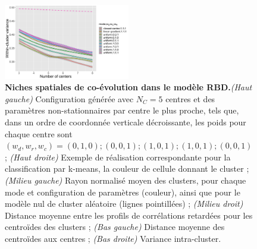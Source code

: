 \documentclass[11pt]{article}
\begin{document}
\begin{figure}
	\includegraphics[width=0.49\textwidth]{figures/withinss.png}
	\caption{\textbf{Niches spatiales de co-évolution dans le modèle RBD.}\textit{(Haut gauche)} Configuration générée avec $N_C = 5$ centres et des paramètres non-stationnaires par centre le plus proche, tels que, dans un ordre de coordonnée verticale décroissante, les poids pour chaque centre sont $(w_d,w_r,w_c) = (0,1,0) ; (0,0,1) ; (1,0,1) ; (1,0,1) ; (0,0,1)$ ; \textit{(Haut droite)} Exemple de réalisation correspondante pour la classification par k-means, la couleur de cellule donnant le cluster ; \textit{(Milieu gauche)} Rayon normalisé moyen des clusters, pour chaque mode et configuration de paramètres (couleur), ainsi que pour le modèle nul de cluster aléatoire (lignes pointillées) ; \textit{(Milieu droit)} Distance moyenne entre les profils de corrélations retardées pour les centroïdes des clusters ; \textit{(Bas gauche)} Distance moyenne des centroïdes aux centres ; \textit{(Bas droite)} Variance intra-cluster.}
	\label{fig:rbd}
\end{figure}

 
 
\end{document}
